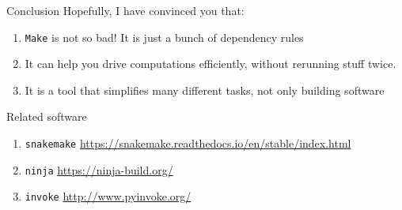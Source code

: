 \documentclass[10pt]{beamer}
\newcommand{\textco}[1]{\colorbox{bg_gray}{\texttt{#1}}}
\begin{document}
\begin{frame}{Conclusion}
  Hopefully, I have convinced you that:
  \begin{enumerate}[<+->]
    \item \textco{Make} is not so bad! It is just a bunch of dependency rules
    \item It can help you drive computations efficiently, without rerunning
      stuff twice.
    \item It is a tool that simplifies many different tasks, not only building software
  \end{enumerate}
\end{frame}

\begin{frame}{Related software}
  \begin{enumerate}
  \item \textco{snakemake} {\footnotesize \url{https://snakemake.readthedocs.io/en/stable/index.html}}
  \item \textco{ninja} {\footnotesize \url{https://ninja-build.org/}}
  \item \textco{invoke} {\footnotesize \url{http://www.pyinvoke.org/}}
  \end{enumerate}
\end{frame}
\end{document}
